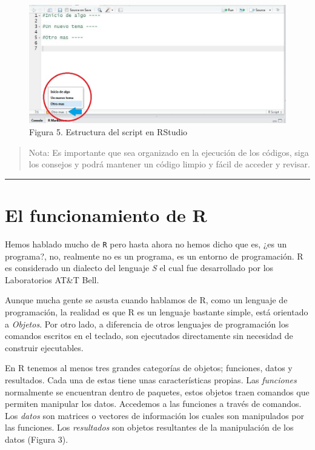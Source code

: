 \documentclass[
]{article}
\begin{document}
\begin{figure}
\centering
\includegraphics{imagen/estructura.jpg}
\caption{Figura 5. Estructura del script en RStudio}
\end{figure}

\begin{quote}
Nota: Es importante que sea organizado en la ejecución de los códigos,
siga los consejos y podrá mantener un código limpio y fácil de acceder y
revisar.
\end{quote}

\begin{center}\rule{0.5\linewidth}{0.5pt}\end{center}

\hypertarget{el-funcionamiento-de-r}{%
\section{El funcionamiento de R}\label{el-funcionamiento-de-r}}

Hemos hablado mucho de \texttt{R} pero hasta ahora no hemos dicho que
es, ¿es un programa?, no, realmente no es un programa, es un entorno de
programación. R es considerado un dialecto del lenguaje \emph{S} el cual
fue desarrollado por los Laboratorios AT\&T Bell.

Aunque mucha gente se asusta cuando hablamos de R, como un lenguaje de
programación, la realidad es que R es un lenguaje bastante simple, está
orientado a \emph{Objetos}. Por otro lado, a diferencia de otros
lenguajes de programación los comandos escritos en el teclado, son
ejecutados directamente sin necesidad de construir ejecutables.

En R tenemos al menos tres grandes categorías de objetos; funciones,
datos y resultados. Cada una de estas tiene unas características
propias. Las \emph{funciones} normalmente se encuentran dentro de
paquetes, estos objetos traen comandos que permiten manipular los datos.
Accedemos a las funciones a través de comandos. Los \emph{datos} son
matrices o vectores de información los cuales son manipulados por las
funciones. Los \emph{resultados} son objetos resultantes de la
manipulación de los datos (Figura 3).
\end{document}
